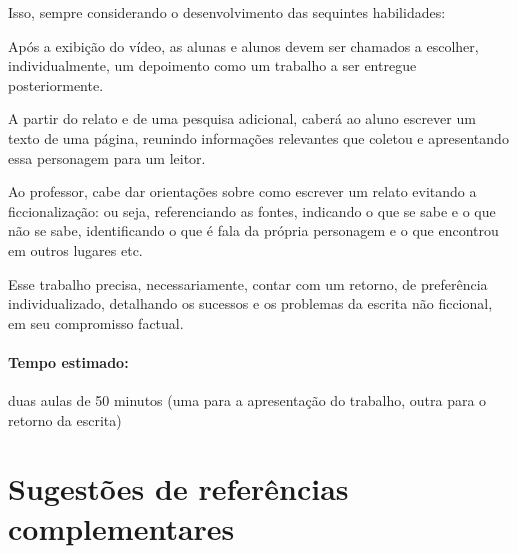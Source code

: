 \documentclass[12pt]{extarticle}
\begin{document}
Isso, sempre considerando o desenvolvimento das sequintes habilidades:


Após a exibição do vídeo, as alunas e alunos devem ser chamados a
escolher, individualmente, um depoimento como um trabalho a ser entregue
posteriormente.

A partir do relato e de uma pesquisa adicional, caberá ao aluno escrever
um texto de uma página, reunindo informações relevantes que coletou e
apresentando essa personagem para um leitor.

Ao professor, cabe dar orientações sobre como escrever um relato
evitando a ficcionalização: ou seja, referenciando as fontes, indicando
o que se sabe e o que não se sabe, identificando o que é fala da própria
personagem e o que encontrou em outros lugares etc.

Esse trabalho precisa, necessariamente, contar com um retorno, de
preferência individualizado, detalhando os sucessos e os problemas da
escrita não ficcional, em seu compromisso factual.

\paragraph{Tempo estimado:} duas aulas de 50 minutos (uma para a
apresentação do trabalho, outra para o retorno da escrita)


\section{Sugestões de referências complementares}
\end{document}
